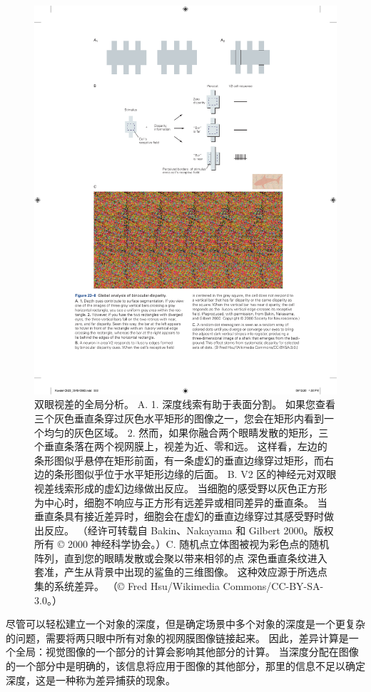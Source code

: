 \begin{figure}[htbp]
	\centering
	\includegraphics[width=0.75\linewidth]{chap23/fig_23_8}
	\caption{双眼视差的全局分析。 A. 1. 深度线索有助于表面分割。 如果您查看三个灰色垂直条穿过灰色水平矩形的图像之一，您会在矩形内看到一个均匀的灰色区域。 2. 然而，如果你融合两个眼睛发散的矩形，三个垂直条落在两个视网膜上，视差为近、零和远。 这样看，左边的条形图似乎悬停在矩形前面，有一条虚幻的垂直边缘穿过矩形，而右边的条形图似乎位于水平矩形边缘的后面。 B. V2 区的神经元对双眼视差线索形成的虚幻边缘做出反应。 当细胞的感受野以灰色正方形为中心时，细胞不响应与正方形有远差异或相同差异的垂直条。 当垂直条具有接近差异时，细胞会在虚幻的垂直边缘穿过其感受野时做出反应。 （经许可转载自 Bakin、Nakayama 和 Gilbert 2000。版权所有 © 2000 神经科学协会。）C. 随机点立体图被视为彩色点的随机阵列，直到您的眼睛发散或会聚以带来相邻的点 深色垂直条纹进入套准，产生从背景中出现的鲨鱼的三维图像。 这种效应源于所选点集的系统差异。 （© Fred Hsu/Wikimedia Commons/CC-BY-SA-3.0。）}
	\label{fig:23_8}
\end{figure}


尽管可以轻松建立一个对象的深度，但是确定场景中多个对象的深度是一个更复杂的问题，需要将两只眼中所有对象的视网膜图像链接起来。 
因此，差异计算是一个全局：视觉图像的一个部分的计算会影响其他部分的计算。 
当深度分配在图像的一个部分中是明确的，该信息将应用于图像的其他部分，那里的信息不足以确定深度，这是一种称为差异捕获的现象。


